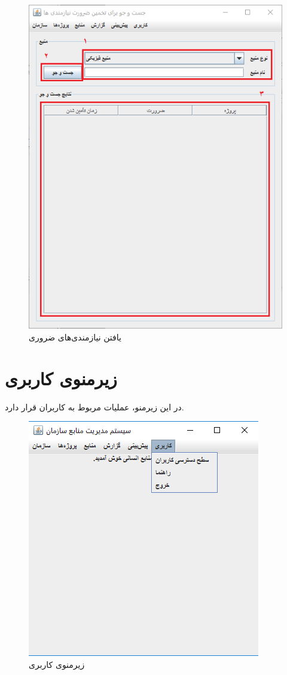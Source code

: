 	\begin{figure}[H]
		\centering
		\includegraphics[scale=0.7]{img/manual/estSearch}
		\caption{یافتن نیازمندی‌های ضروری}
	\end{figure}


\newpage
\section{زیرمنوی کاربری}
در این زیرمنو، عملیات مربوط به کاربران قرار دارد.
	\begin{figure}[H]
		\centering
		\includegraphics[scale=0.7]{img/manual/userSubmenu}
		\caption{زیرمنوی کاربری}
	\end{figure}

